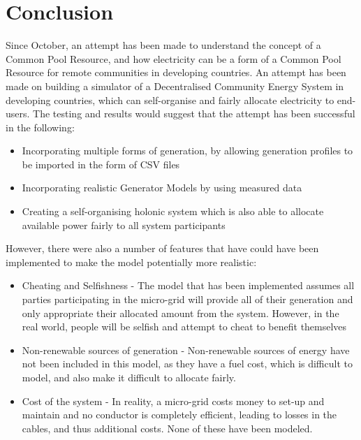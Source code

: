 \chapter{Conclusion}
\label{Conclusions}

Since October, an attempt has been made to understand the concept of a Common Pool Resource, and how electricity can be a form of a Common Pool Resource for remote communities in developing countries. An attempt has been made on building a simulator of a Decentralised Community Energy System in developing countries, which can self-organise and fairly allocate electricity to end-users. The testing and results would suggest that the attempt has been successful in the following:
\begin{itemize}
	\item Incorporating multiple forms of generation, by allowing generation profiles to be imported in the form of CSV files
	\item Incorporating realistic Generator Models by using measured data
	\item Creating a self-organising holonic system which is also able to allocate available power fairly to all system participants
\end{itemize}

However, there were also a number of features that have could have been implemented to make the model potentially more realistic:
\begin{itemize}
	\item Cheating and Selfishness - The model that has been implemented assumes all parties participating in the micro-grid will provide all of their generation and only appropriate their allocated amount from the system. However, in the real world, people will be selfish and attempt to cheat to benefit themselves  
	\item Non-renewable sources of generation - Non-renewable sources of energy have not been included in this model, as they have a fuel cost, which is difficult to model, and also make it difficult to allocate fairly. 
	\item Cost of the system - In reality, a micro-grid costs money to set-up and maintain and no conductor is completely efficient, leading to losses in the cables, and thus additional costs. None of these have been modeled.
\end{itemize}


